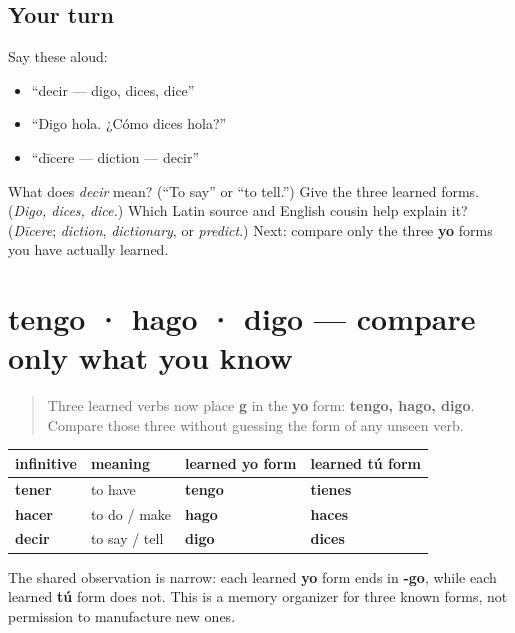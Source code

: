 \subsection*{Your turn}
Say these aloud:

\begin{itemize}
\raggedright
  \item “decir — digo, dices, dice”
  \item “Digo hola. ¿Cómo dices hola?”
  \item “dīcere — diction — decir”
\end{itemize}

\begin{tcolorbox}[breakable,colback=teal!4,colframe=teal!35!black,title={Before you move on}]
What does \emph{decir} mean? (“To say” or “to tell.”) Give the three learned forms. (\emph{Digo, dices, dice.}) Which Latin source and English cousin help explain it? (\emph{Dīcere}; \emph{diction}, \emph{dictionary}, or \emph{predict}.) Next: compare only the three \textbf{yo} forms you have actually learned.
\end{tcolorbox}
\section[tengo · hago · digo]{tengo · hago · digo — compare only what you know}

\label{lesson:ES-C12-yo-go}



\begin{quote}
Three learned verbs now place \textbf{g} in the \textbf{yo} form: \textbf{tengo, hago, digo}. Compare those three without guessing the form of any unseen verb.
\end{quote}

\begin{grammarlens}[title={Grammar Lens: one visible corner}]
\noindent
\begin{tabularx}{\linewidth}{@{}>{\raggedright\arraybackslash}X>{\raggedright\arraybackslash}X>{\raggedright\arraybackslash}X>{\raggedright\arraybackslash}X@{}}
\toprule
\textbf{infinitive} & \textbf{meaning} & \textbf{learned \textbf{yo} form} & \textbf{learned \textbf{tú} form} \\
\midrule
\textbf{tener} & to have & \textbf{tengo} & \textbf{tienes} \\
\textbf{hacer} & to do / make & \textbf{hago} & \textbf{haces} \\
\textbf{decir} & to say / tell & \textbf{digo} & \textbf{dices} \\
\bottomrule
\end{tabularx}

The shared observation is narrow: each learned \textbf{yo} form ends in \textbf{-go}, while each learned \textbf{tú} form does not. This is a memory organizer for three known forms, not permission to manufacture new ones.
\end{grammarlens}


